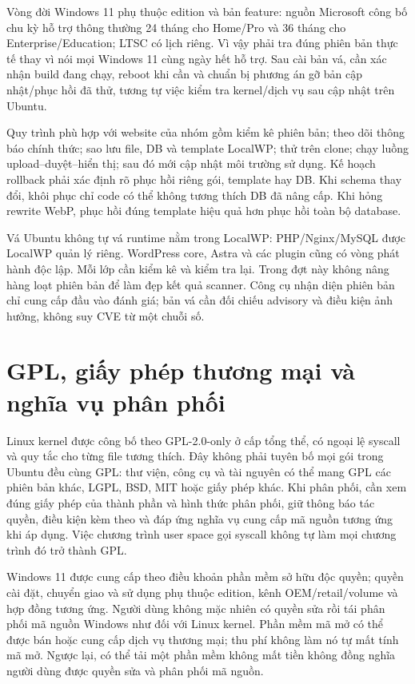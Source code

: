 Vòng đời Windows 11 phụ thuộc edition và bản feature: nguồn Microsoft công bố chu kỳ hỗ trợ thông thường 24 tháng cho Home/Pro và 36 tháng cho Enterprise/Education; LTSC có lịch riêng. Vì vậy phải tra đúng phiên bản thực tế thay vì nói mọi Windows 11 cùng ngày hết hỗ trợ. Sau cài bản vá, cần xác nhận build đang chạy, reboot khi cần và chuẩn bị phương án gỡ bản cập nhật/phục hồi đã thử, tương tự việc kiểm tra kernel/dịch vụ sau cập nhật trên Ubuntu.\cite{windowsLifecycle}

Quy trình phù hợp với website của nhóm gồm kiểm kê phiên bản; theo dõi thông báo chính thức; sao lưu file, DB và template LocalWP; thử trên clone; chạy luồng upload--duyệt--hiển thị; sau đó mới cập nhật môi trường sử dụng. Kế hoạch rollback phải xác định rõ phục hồi riêng gói, template hay DB. Khi schema thay đổi, khôi phục chỉ code có thể không tương thích DB đã nâng cấp. Khi hỏng rewrite WebP, phục hồi đúng template hiệu quả hơn phục hồi toàn bộ database.

Vá Ubuntu không tự vá runtime nằm trong LocalWP: PHP/Nginx/MySQL được LocalWP quản lý riêng. WordPress core, Astra và các plugin cũng có vòng phát hành độc lập. Mỗi lớp cần kiểm kê và kiểm tra lại. Trong đợt này không nâng hàng loạt phiên bản để làm đẹp kết quả scanner. Công cụ nhận diện phiên bản chỉ cung cấp đầu vào đánh giá; bản vá cần đối chiếu advisory và điều kiện ảnh hưởng, không suy CVE từ một chuỗi số.

\section{GPL, giấy phép thương mại và nghĩa vụ phân phối}
Linux kernel được công bố theo GPL-2.0-only ở cấp tổng thể, có ngoại lệ syscall và quy tắc cho từng file tương thích. Đây không phải tuyên bố mọi gói trong Ubuntu đều cùng GPL: thư viện, công cụ và tài nguyên có thể mang GPL các phiên bản khác, LGPL, BSD, MIT hoặc giấy phép khác. Khi phân phối, cần xem đúng giấy phép của thành phần và hình thức phân phối, giữ thông báo tác quyền, điều kiện kèm theo và đáp ứng nghĩa vụ cung cấp mã nguồn tương ứng khi áp dụng. Việc chương trình user space gọi syscall không tự làm mọi chương trình đó trở thành GPL.\cite{linuxKernel,ubuntuLicensing}

Windows 11 được cung cấp theo điều khoản phần mềm sở hữu độc quyền; quyền cài đặt, chuyển giao và sử dụng phụ thuộc edition, kênh OEM/retail/volume và hợp đồng tương ứng. Người dùng không mặc nhiên có quyền sửa rồi tái phân phối mã nguồn Windows như đối với Linux kernel. Phần mềm mã mở có thể được bán hoặc cung cấp dịch vụ thương mại; thu phí không làm nó tự mất tính mã mở. Ngược lại, có thể tải một phần mềm không mất tiền không đồng nghĩa người dùng được quyền sửa và phân phối mã nguồn.\cite{windowsTerms}

